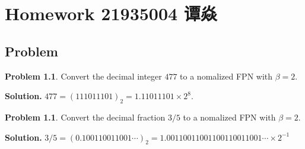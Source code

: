 \documentclass[a4paper]{book}
\makeatletter
\newenvironment{solution}%
{\noindent\textbf{Solution.}}%
{\qedhere}
\newcommand{\voidenvironment}[1]{%
  \expandafter\providecommand\csname env@#1@save@env\endcsname{}%
  \expandafter\providecommand\csname env@#1@process\endcsname{}%
  \@ifundefined{#1}{}{\RenewEnviron{#1}{}}%
}
\numberwithin{equation}{chapter}
\theoremstyle{definition}
\newtheorem{pro}[exm]{Problem}
\makeatother
\begin{document}
\pagestyle{empty}
% 



\setcounter{chapter}{5}




\chapter{Homework 21935004 谭焱}



\section{Problem}\label{sec:p}
\begin{pro}
  Convert the decimal integer $477$ to a nomalized FPN with $\beta = 2$.
\end{pro}

\begin{solution}
  $477 = (111011101)_2 = 1.11011101 \times 2^8$.
\end{solution}

\begin{pro}\label{cha:2}
  Convert the decimal fraction $3/5$ to a nomalized FPN with $\beta = 2$.
\end{pro}

\begin{solution}
  $3/5 = (0.100110011001\cdots)_2 = 1.00110011001100110011001\cdots \times 2^{-1}$
\end{solution}
\end{document}
